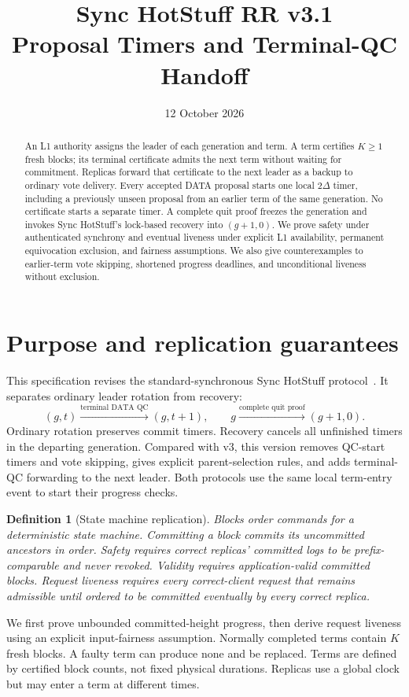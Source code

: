 \documentclass[11pt,a4paper]{article}
\title{Sync HotStuff RR v3.1\\\large Proposal Timers and Terminal-QC Handoff}
\author{}\date{12 October 2026}
\newtheorem{definition}{Definition}[section]
\newcounter{protocol}
\begin{document}
\maketitle
\begin{abstract}
An L1 authority assigns the leader of each generation and term.
A term certifies $K\ge1$ fresh blocks; its terminal certificate admits
the next term without waiting for commitment. Replicas forward that
certificate to the next leader as a backup to ordinary vote delivery.
Every accepted DATA proposal starts one local $2\Delta$ timer, including
a previously unseen proposal from an earlier term of the same generation.
No certificate starts a separate timer. A complete quit proof freezes the
generation and invokes Sync HotStuff's lock-based recovery into $(g+1,0)$.
We prove safety under authenticated synchrony and eventual liveness under
explicit L1 availability, permanent equivocation exclusion, and fairness
assumptions. We also give counterexamples to earlier-term vote skipping,
shortened progress deadlines, and unconditional liveness without exclusion.
\end{abstract}

\section{Purpose and replication guarantees}
\label{sec:scope}
This specification revises the standard-synchronous Sync HotStuff
protocol~\cite{sync}. It separates ordinary leader rotation from recovery:
\[
 (g,t)\xrightarrow{\text{terminal DATA QC}}(g,t+1),
 \qquad
 g\xrightarrow{\text{complete quit proof}}(g+1,0).
\]
Ordinary rotation preserves commit timers. Recovery cancels all unfinished
timers in the departing generation. Compared with v3, this version removes
QC-start timers and vote skipping, gives explicit parent-selection rules,
and adds terminal-QC forwarding to the next leader. Both protocols use the
same local term-entry event to start their progress checks.

\begin{definition}[State machine replication]
Blocks order commands for a deterministic state machine. Committing a
block commits its uncommitted ancestors in order. \emph{Safety} requires
correct replicas' committed logs to be prefix-comparable and never revoked.
\emph{Validity} requires application-valid committed blocks.
\emph{Request liveness} requires every correct-client request that remains
admissible until ordered to be committed eventually by every correct replica.
\end{definition}
We first prove unbounded committed-height progress, then derive request
liveness using an explicit input-fairness assumption. Normally completed
terms contain $K$ fresh blocks. A faulty term can produce none and be
replaced. Terms are defined by certified block counts, not fixed physical
durations. Replicas use a global clock but may enter a term at different times.
\end{document}
